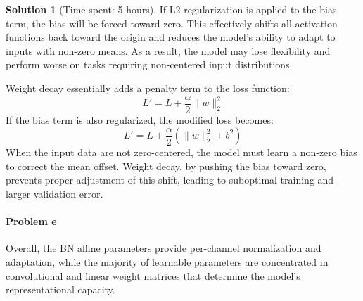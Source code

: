\documentclass[11pt, reqno, letterpaper, twoside]{amsart}
\theoremstyle{plain}
\theoremstyle{definition}
\newtheorem{solution}[theorem]{Solution}
\begin{document}
\begin{solution}[Time spent: 5 hours]
If L2 regularization is applied to the bias term, the bias will be forced toward zero.
This effectively shifts all activation functions back toward the origin
and reduces the model’s ability to adapt to inputs with non-zero means.
As a result, the model may lose flexibility and perform worse on tasks requiring
non-centered input distributions.

Weight decay essentially adds a penalty term to the loss function:
\[
L' = L + \frac{\alpha}{2}\|w\|_2^2
\]
If the bias term is also regularized, the modified loss becomes:
\[
L' = L + \frac{\alpha}{2}(\|w\|_2^2 + b^2)
\]
When the input data are not zero-centered, the model must learn a non-zero bias
to correct the mean offset.
Weight decay, by pushing the bias toward zero, prevents proper adjustment of this shift,
leading to suboptimal training and larger validation error.

\paragraph{\textbf{Problem e}} 
Overall, the BN affine parameters provide per-channel normalization and adaptation, 
while the majority of learnable parameters are concentrated in convolutional and linear weight matrices that determine the model's representational capacity.\\
\begin{table}[H]
\centering
\scriptsize
\setlength{\tabcolsep}{4pt}
\renewcommand{\arraystretch}{1.1}
\end{table}
\end{solution}
\end{document}
